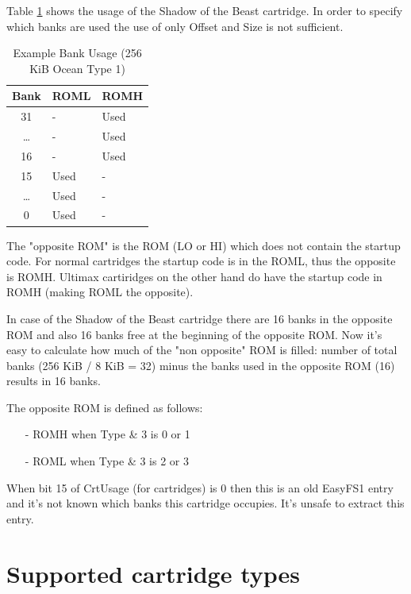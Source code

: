 \documentclass[a4paper,oneside]{memoir}
\begin{document}
Table \ref{tab:bank-usage-oc1-256k} shows the usage of the Shadow of the Beast cartridge.
In order to specify which banks are used the use of only Offset and Size is not sufficient.

\begin{table}[!htbp]
    \centering
    \begin{tabularx}{0.6\textwidth}{c|X|X}
        \toprule
        Bank & ROML & ROMH \\
        \midrule
        31 & - & Used \\
        \ldots & - & Used \\
        16 & - & Used \\
        15 & Used & - \\
        \ldots & Used & - \\
        0 & Used & - \\
        \bottomrule
    \end{tabularx}
    \caption{Example Bank Usage (256 KiB Ocean Type 1)}
    \label{tab:bank-usage-oc1-256k}
\end{table}

The "opposite ROM" is the ROM (LO or HI) which does not contain the startup code.
For normal cartridges the startup code is in the ROML, thus the opposite is ROMH.
Ultimax cartiridges on the other hand do have the startup code in ROMH
(making ROML the opposite).

In case of the Shadow of the Beast cartridge
there are 16 banks in the opposite ROM and also 16 banks free at the
beginning of the opposite ROM. Now it's easy to calculate how much of the
"non opposite" ROM is filled: number of total banks (256 KiB / 8 KiB = 32)
minus the banks used in the opposite ROM (16) results in 16 banks.

The opposite ROM is defined as follows:
\begin{itemize}
\item[-] ROMH when Type \& 3 is 0 or 1
\item[-] ROML when Type \& 3 is 2 or 3
\end{itemize}

When bit 15 of CrtUsage (for cartridges) is 0 then this is an old EasyFS1
entry and it's not known which banks this cartridge occupies.
It's unsafe to extract this entry.


\chapter{Supported cartridge types}
\end{document}
